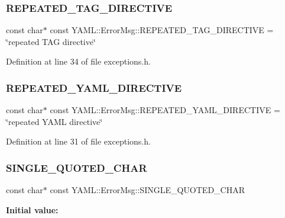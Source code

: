\subsubsection{\texorpdfstring{REPEATED\_TAG\_DIRECTIVE}{REPEATED\_TAG\_DIRECTIVE}}
{\footnotesize\ttfamily const char$\ast$ const Y\+A\+M\+L\+::\+Error\+Msg\+::\+R\+E\+P\+E\+A\+T\+E\+D\+\_\+\+T\+A\+G\+\_\+\+D\+I\+R\+E\+C\+T\+I\+VE = \char`\"{}repeated T\+AG directive\char`\"{}}



Definition at line 34 of file exceptions.\+h.

\mbox{\label{namespace_y_a_m_l_1_1_error_msg_a7ab08aea1a9971d744ae02c720327e23}} 
\subsubsection{\texorpdfstring{REPEATED\_YAML\_DIRECTIVE}{REPEATED\_YAML\_DIRECTIVE}}
{\footnotesize\ttfamily const char$\ast$ const Y\+A\+M\+L\+::\+Error\+Msg\+::\+R\+E\+P\+E\+A\+T\+E\+D\+\_\+\+Y\+A\+M\+L\+\_\+\+D\+I\+R\+E\+C\+T\+I\+VE = \char`\"{}repeated Y\+A\+ML directive\char`\"{}}



Definition at line 31 of file exceptions.\+h.

\mbox{\label{namespace_y_a_m_l_1_1_error_msg_a725bce1a39331562ff42718a0a29bb56}} 
\subsubsection{\texorpdfstring{SINGLE\_QUOTED\_CHAR}{SINGLE\_QUOTED\_CHAR}}
{\footnotesize\ttfamily const char$\ast$ const Y\+A\+M\+L\+::\+Error\+Msg\+::\+S\+I\+N\+G\+L\+E\+\_\+\+Q\+U\+O\+T\+E\+D\+\_\+\+C\+H\+AR}

{\bfseries Initial value\+:}
\begin{DoxyCode}{0}
\DoxyCodeLine{=}
\DoxyCodeLine{    \textcolor{stringliteral}{"invalid character in single-quoted string"}}

\end{DoxyCode}


